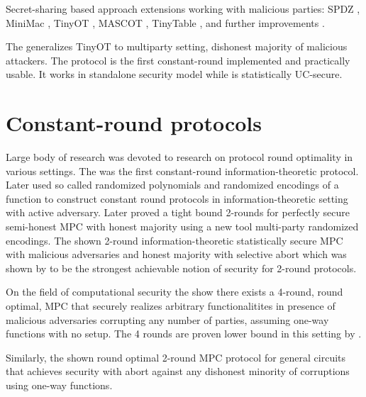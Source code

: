 \documentclass[
  digital, %
  twoside, %
  table,   %
  lof,     %
  lot,     %
]{fithesis3}
\begin{document}
Secret-sharing based approach extensions working with malicious parties: SPDZ \cite{DPSZ12, cryptoeprint:2012:642}, MiniMac \cite{DZ13}, TinyOT \cite{NNOB12}, MASCOT \cite{KOS16}, TinyTable \cite{cryptoeprint:2016:695}, and further improvements \cite{FKOS15, DZ16, LPJ17, BCGIM17, cryptoeprint:2017:1230}. 

The \cite{WRK17} generalizes TinyOT to multiparty setting, dishonest majority of malicious attackers. The protocol is the first constant-round implemented and practically usable. It works in standalone security model while \cite{DPSZ12} is statistically UC-secure. 

\section{Constant-round protocols}%
Large body of research was devoted to research on protocol round optimality in various settings. The \cite{BB89} was the first constant-round information-theoretic protocol. Later \cite{IK00, IK02} used so called randomized polynomials and randomized encodings \cite{AIK04} of a function to construct constant round protocols in information-theoretic setting with active adversary. Later \cite{ABT18} proved a tight bound 2-rounds for perfectly secure semi-honest MPC with honest majority using a new tool multi-party randomized encodings. The \cite{cryptoeprint:2018:1078} shown 2-round information-theoretic statistically secure MPC with malicious adversaries and honest majority with selective abort which was shown by \cite{GIKR04} to be the strongest achievable notion of security for 2-round protocols.

On the field of computational security the \cite{cryptoeprint:2017:1056} show there exists a 4-round, round optimal, MPC that securely realizes arbitrary functionalitites in presence of malicious adversaries corrupting any number of parties, assuming one-way functions with no setup. The 4 rounds are proven lower bound in this setting by \cite{cryptoeprint:2016:252}.

Similarly, the \cite{cryptoeprint:2018:572} shown round optimal 2-round MPC protocol for general circuits that achieves security with abort against any dishonest minority of corruptions using one-way functions.
\end{document}
